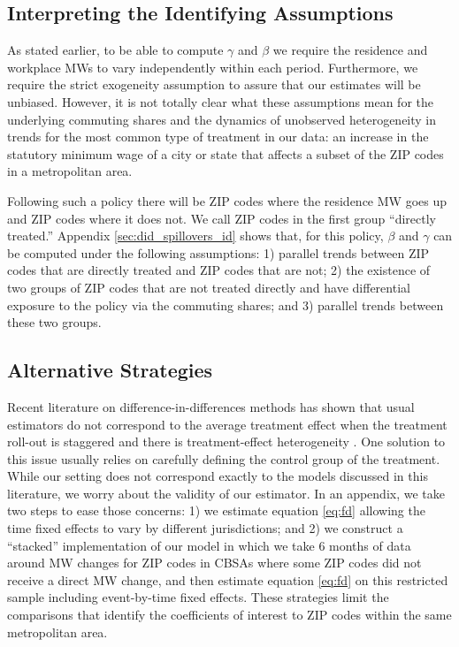 \subsection{Interpreting the Identifying Assumptions}

As stated earlier, to be able to compute $\gamma$ and $\beta$ we require the 
residence and workplace MWs to vary independently within each period.
Furthermore, we require the strict exogeneity assumption to assure that our
estimates will be unbiased.
However, it is not totally clear what these assumptions mean for the underlying 
commuting shares and the dynamics of unobserved heterogeneity in trends for the 
most common type of treatment in our data: 
an increase in the statutory minimum wage of a city or state that affects 
a subset of the ZIP codes in a metropolitan area.

Following such a policy there will be ZIP codes where the residence MW goes up
and ZIP codes where it does not.
We call ZIP codes in the first group ``directly treated.''
Appendix \ref{sec:did_spillovers_id} shows that, for this policy, 
$\beta$ and $\gamma$ can be computed under the following assumptions: 
1) parallel trends between ZIP codes that are directly treated and ZIP codes 
that are not;
2) the existence of two groups of ZIP codes that are not treated directly and
have differential exposure to the policy via the commuting shares; and 
3) parallel trends between these two groups.

\subsection{Alternative Strategies}\label{sec:alt_emp_strategies}

Recent literature on difference-in-differences methods has shown that usual
estimators do not correspond to the average treatment effect when the treatment 
roll-out is staggered and there is treatment-effect heterogeneity 
\parencite{deChaisemartinEtAl2022,RothEtAl2022}.
One solution to this issue usually relies on carefully defining the control
group of the treatment.
While our setting does not correspond exactly to the models discussed in this
literature, we worry about the validity of our estimator.
In an appendix, we take two steps to ease those concerns:
1) we estimate equation \eqref{eq:fd} allowing the time fixed effects to vary
by different jurisdictions; and
2) we construct a ``stacked'' implementation of our model in which we take
6 months of data around MW changes for ZIP codes in CBSAs where some ZIP codes 
did not receive a direct MW change, and then estimate equation \eqref{eq:fd} on
this restricted sample including event-by-time fixed effects.
These strategies limit the comparisons that identify the coefficients of 
interest to ZIP codes within the same metropolitan area.

